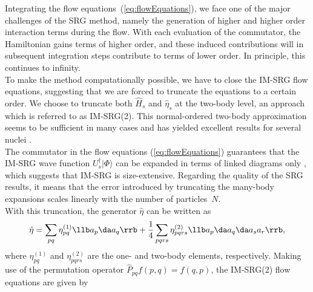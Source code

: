 Integrating the flow equations~(\ref{eq:flowEquations}), we face one
of the major challenges of the SRG method, namely the generation of
higher and higher order interaction terms during the flow. With each
evaluation of the commutator, the Hamiltonian gains terms of higher
order, and these induced contributions will in subsequent integration
steps contribute to terms of lower order. In principle, this continues
to infinity.\\ To make the method computationally possible, we have to
close the IM-SRG flow equations, suggesting that we are forced to
truncate the equations to a certain order. We choose to truncate both
$\hat{H}_s$ and $\hat{\eta}_s$ at the two-body level, an approach
which is referred to as IM-SRG(2).  This normal-ordered two-body
approximation seems to be sufficient in many cases and has yielded
excellent results for several nuclei
\cite{PhysRevLett.106.222502,PhysRevLett.109.052501,IMSRG}.\\ The
commutator in the flow equations (\ref{eq:flowEquations}) guarantees
that the IM-SRG wave function $U_s^\dagger|\Phi\rangle$ can be
expanded in terms of linked diagrams only
\cite{shavitt2009many,ISI:A1981MN73700014}, which suggests that IM-SRG
is size-extensive. Regarding the quality of the SRG results, it means
that the error introduced by truncating the many-body expansions
scales linearly with the number of particles~$N$.\\ With this
truncation, the generator $\hat{\eta}$ can be written as
\[
\hat{\eta} = \sum_{pq} \eta_{pq}^{(1)} \llb a_p\da a_q\rrb +
\frac{1}{4}\sum\limits_{pqrs}\eta_{pqrs}^{(2)} \llb a_p\da a_q\da a_s
a_r \rrb,
\]
where $\eta_{pq}^{(1)}$ and $ \eta_{pqrs}^{(2)}$ are the one- and
two-body elements, respectively. Making use of the permutation
operator $ \hat{P}_{pq}f(p,q) = f(q,p)$, the IM-SRG(2) flow equations
are given by
